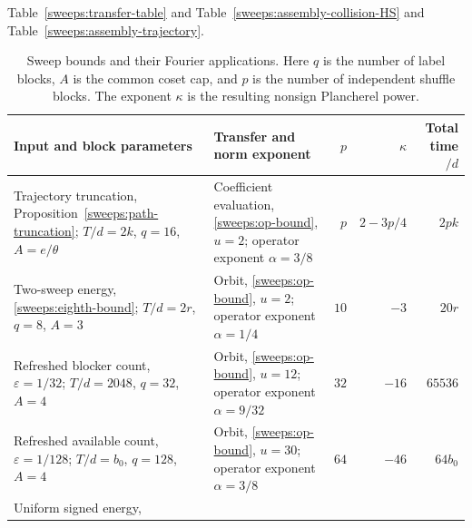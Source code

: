 \documentclass{article}
\newcommand{\phantomsection}{}
\begin{document}
\setcounter{table}{3}
Table~\ref{sweeps:transfer-table} and Table~\ref{sweeps:assembly-collision-HS}
and Table~\ref{sweeps:assembly-trajectory}.
\begingroup
\small
\setlength{\tabcolsep}{4pt}
\renewcommand{\arraystretch}{1.2}
\begin{longtable}{@{}p{.33\linewidth}p{.29\linewidth}r r r@{}}
\caption{Sweep bounds and their Fourier applications. Here $q$ is the
number of label blocks, $A$ is the common coset cap, and $p$ is the
number of independent shuffle blocks. The exponent $\kappa$ is the
resulting nonsign Plancherel power.}\label{sweeps:transfer-table}\\
\toprule
Input and block parameters & Transfer and norm exponent
 & $p$ & $\kappa$ & Total time$/d$\\
\midrule
\endfirsthead
\bottomrule
\endfoot
\phantomsection\label{sweeps:assembly-trajectory}
Trajectory truncation,\newline
Proposition~\ref{sweeps:path-truncation};\newline
$T/d=2k$, $q=16$, $A=e/\theta$
&
Coefficient evaluation,\newline
\eqref{sweeps:op-bound}, $u=2$;\newline
operator exponent $\alpha=3/8$
& $p$ & $2-3p/4$ & $2pk$\\
\phantomsection\label{sweeps:assembly-eight-orbits}
Two-sweep energy, \eqref{sweeps:eighth-bound};\newline
$T/d=2r$, $q=8$, $A=3$
&
Orbit, \eqref{sweeps:op-bound}, $u=2$;\newline
operator exponent $\alpha=1/4$
& $10$ & $-3$ & $20r$\\
\phantomsection\label{sweeps:assembly-blocker-orbits}
Refreshed blocker count,\newline
$\varepsilon=1/32$;\newline
$T/d=2048$, $q=32$, $A=4$
&
Orbit, \eqref{sweeps:op-bound}, $u=12$;\newline
operator exponent $\alpha=9/32$
& $32$ & $-16$ & $65536$\\
\phantomsection\label{sweeps:assembly-hole-orbits}
Refreshed available count,\newline
$\varepsilon=1/128$;\newline
$T/d=b_0$, $q=128$, $A=4$
&
Orbit, \eqref{sweeps:op-bound}, $u=30$;\newline
operator exponent $\alpha=3/8$
& $64$ & $-46$ & $64b_0$\\
\phantomsection\label{sweeps:assembly-colored-HS}
Uniform signed energy,\newline

\end{longtable}
\end{document}
